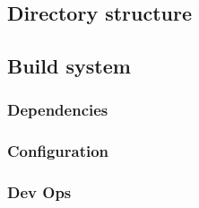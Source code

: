 \subsection{Directory structure}

\begin{description}[font=\computertextfamily\textpluscolon]
\item[lib]
\item[lib/t]
\item[src]
\end{description}


\subsection{Build system}


\subsubsection{Dependencies}


\subsubsection{Configuration}


\subsubsection{Dev Ops}

